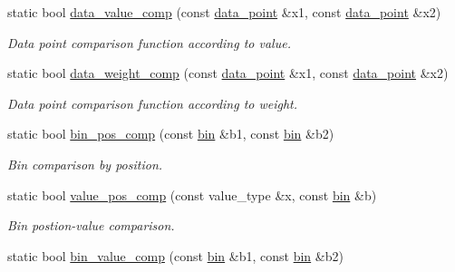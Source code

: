 \begin{DoxyCompactItemize}
\item 
\hypertarget{a00284_a180bb6560a6b52227443d7f5399d6abb}{}static bool \hyperlink{a00284_a180bb6560a6b52227443d7f5399d6abb}{data\+\_\+value\+\_\+comp} (const \hyperlink{a00114}{data\+\_\+point} \&x1, const \hyperlink{a00114}{data\+\_\+point} \&x2)\label{a00284_a180bb6560a6b52227443d7f5399d6abb}

\begin{DoxyCompactList}\small\item\em Data point comparison function according to value. \end{DoxyCompactList}\item 
\hypertarget{a00284_a5354c06b243a5a1de746ecac7d148ceb}{}static bool \hyperlink{a00284_a5354c06b243a5a1de746ecac7d148ceb}{data\+\_\+weight\+\_\+comp} (const \hyperlink{a00114}{data\+\_\+point} \&x1, const \hyperlink{a00114}{data\+\_\+point} \&x2)\label{a00284_a5354c06b243a5a1de746ecac7d148ceb}

\begin{DoxyCompactList}\small\item\em Data point comparison function according to weight. \end{DoxyCompactList}\item 
\hypertarget{a00284_a612440dcebdb0e4449a781854de8933a}{}static bool \hyperlink{a00284_a612440dcebdb0e4449a781854de8933a}{bin\+\_\+pos\+\_\+comp} (const \hyperlink{a00021}{bin} \&b1, const \hyperlink{a00021}{bin} \&b2)\label{a00284_a612440dcebdb0e4449a781854de8933a}

\begin{DoxyCompactList}\small\item\em Bin comparison by position. \end{DoxyCompactList}\item 
\hypertarget{a00284_a9945d8887d608c45a7be390ab073a6e2}{}static bool \hyperlink{a00284_a9945d8887d608c45a7be390ab073a6e2}{value\+\_\+pos\+\_\+comp} (const value\+\_\+type \&x, const \hyperlink{a00021}{bin} \&b)\label{a00284_a9945d8887d608c45a7be390ab073a6e2}

\begin{DoxyCompactList}\small\item\em Bin postion-\/value comparison. \end{DoxyCompactList}\item 
\hypertarget{a00284_aa29cb6ea9d66cdc88c6c333f4d34803a}{}static bool \hyperlink{a00284_aa29cb6ea9d66cdc88c6c333f4d34803a}{bin\+\_\+value\+\_\+comp} (const \hyperlink{a00021}{bin} \&b1, const \hyperlink{a00021}{bin} \&b2)\label{a00284_aa29cb6ea9d66cdc88c6c333f4d34803a}


\end{DoxyCompactItemize}
